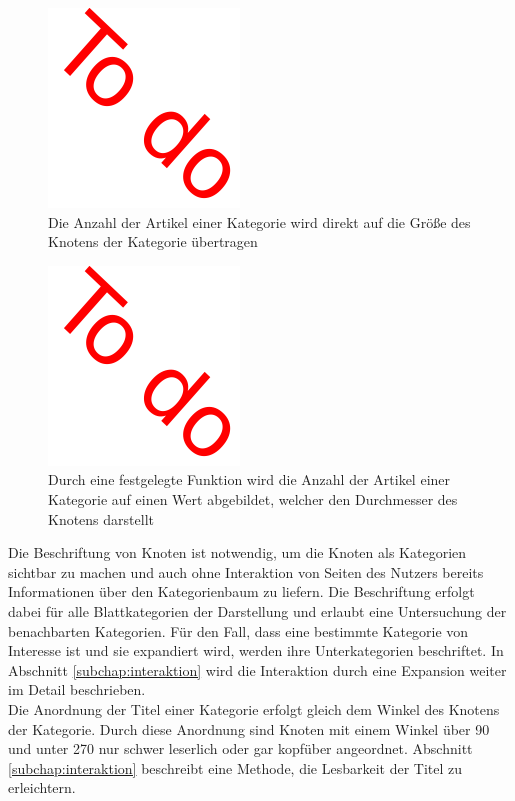 \begin{figure}
    \centering
    \includegraphics{images/todobild.pdf}
    \caption{Die Anzahl der Artikel einer Kategorie wird direkt auf die Größe des Knotens der Kategorie übertragen}
    \label{fig:cat-size-direct}
\end{figure}

\begin{figure}
    \centering
    \includegraphics{images/todobild.pdf}
    \caption{Durch eine festgelegte Funktion wird die Anzahl der Artikel einer Kategorie auf einen Wert abgebildet, welcher den Durchmesser des Knotens darstellt}
    \label{fig:cat-size-fixed}
\end{figure}

Die Beschriftung von Knoten ist notwendig, um die Knoten als Kategorien sichtbar zu machen und auch ohne Interaktion von Seiten des Nutzers bereits Informationen über den Kategorienbaum zu liefern.
Die Beschriftung erfolgt dabei für alle Blattkategorien der Darstellung und erlaubt eine Untersuchung der benachbarten Kategorien.
Für den Fall, dass eine bestimmte Kategorie von Interesse ist und sie expandiert wird, werden ihre Unterkategorien beschriftet.
In Abschnitt \ref{subchap:interaktion} wird die Interaktion durch eine Expansion weiter im Detail beschrieben.\\
Die Anordnung der Titel einer Kategorie erfolgt gleich dem Winkel des Knotens der Kategorie.
Durch diese Anordnung sind Knoten mit einem Winkel über 90 \textdegree und unter 270 \textdegree nur schwer leserlich oder gar kopfüber angeordnet.
Abschnitt \ref{subchap:interaktion} beschreibt eine Methode, die Lesbarkeit der Titel zu erleichtern.


